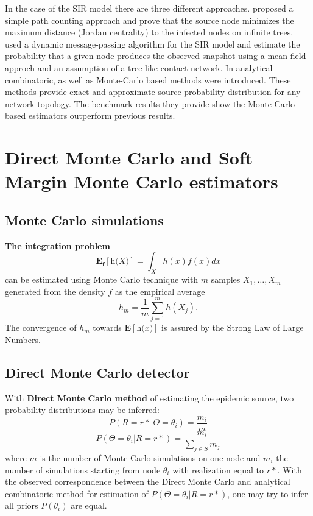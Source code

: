 \documentclass[times, utf8, diplomski]{fer}
\begin{document}
In the case of the SIR model there are three different approaches. \cite{Zhu} proposed a simple path counting approach and prove that the source node minimizes the maximum distance (Jordan centrality) to the infected nodes on infinite trees. \cite{Lohkov} used a dynamic message-passing algorithm for the SIR model and estimate the probability that a given node produces the observed snapshot using a mean-field approch and an assumption of a tree-like contact network. In \cite{Nino} analytical combinatoric, as well as Monte-Carlo based methods were introduced. These methods provide exact and approximate source probability distribution for any network topology. The benchmark results they provide show the Monte-Carlo based estimators outperform previous results.

\section{Direct Monte Carlo and Soft Margin Monte Carlo estimators}

\subsection{Monte Carlo simulations}

\textbf{The integration problem}
\begin{equation}
\mathbf{E_f[\textit{h(X)}]} = \int_{X} h(x) f(x) dx
\label{exp}
\end{equation} can be estimated using Monte Carlo technique with $m$ samples $X_1, \ldots, X_m$ generated from the density $f$ as the empirical average 
\begin{equation*}
h_m = \frac{1}{m} \sum_{j = 1}^{m} h(X_j).
\end{equation*}
The convergence of $h_m$ towards $\mathbf{E[\textit{h(x)}]}$ is assured by the Strong Law of Large Numbers.

\subsection{Direct Monte Carlo detector}

With \textbf{Direct Monte Carlo method} of estimating the epidemic source, two probability distributions may be inferred: 
\begin{equation}
P(R = r* | \Theta = \theta_i) = \frac{m_i}{m}  
\end{equation}
\begin{equation}
P(\Theta = \theta_i | R = r*) = \frac{m_i}{\sum_{j \in S} m_j}
\end{equation}
where $m$ is the number of Monte Carlo simulations on one node and $m_i$ the number of simulations starting from node $\theta_i$ with realization equal to $r*$. With the observed correspondence between the Direct Monte Carlo and analytical combinatoric method for estimation of $P(\Theta = \theta_i | R = r*)$, one may try to infer all priors $P(\theta_i)$ are equal. 
\end{document}
